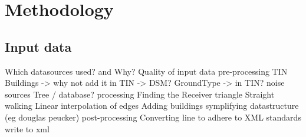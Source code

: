 \chapter{Methodology}

\section{Input data}

	
	Which datasources used? and Why?
	Quality of input data
	pre-processing
	TIN
	Buildings -> why not add it in TIN -> DSM?
	GroundType -> in TIN?
	noise sources
	Tree / database?
processing
	Finding the Receiver triangle
	Straight walking
	Linear interpolation of edges
	Adding buildings
	symplifying datastructure (eg douglas peucker)
post-processing
	Converting line to adhere to XML standards
	write to xml